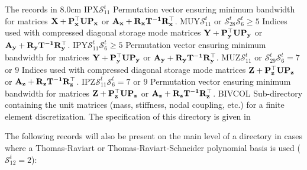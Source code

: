 \begin{DescriptionEnregistrement}{The  records in
}{8.0cm}
  {IPX}{$\mathcal{S}^{t}_{11}$}
  {Permutation vector ensuring minimum bandwidth for matrices $\bf{X}+\bf{P}_x^\top \bf{U}\bf{P}_x$ or $\bf{A}_x+\bf{R}_x\bf{T}^{-1}\bf{R}_x^\top$.} 
\OptIntEnr
  {MUY}{$\mathcal{S}^{t}_{11}$ or $\mathcal{S}^{t}_{28}$}{$\mathcal{S}^{t}_{6}\ge 5$}
  {Indices used with compressed diagonal storage mode matrices $\bf{Y}+\bf{P}_y^\top \bf{U}\bf{P}_y$ or $\bf{A}_y+\bf{R}_y\bf{T}^{-1}\bf{R}_y^\top$.} 
\OptIntEnr
  {IPY}{$\mathcal{S}^{t}_{11}$}{$\mathcal{S}^{t}_{6}\ge 5$}
  {Permutation vector ensuring minimum bandwidth for matrices $\bf{Y}+\bf{P}_y^\top \bf{U}\bf{P}_y$ or $\bf{A}_y+\bf{R}_y\bf{T}^{-1}\bf{R}_y^\top$.} 
\OptIntEnr
  {MUZ}{$\mathcal{S}^{t}_{11}$ or $\mathcal{S}^{t}_{29}$}{$\mathcal{S}^{t}_{6}=7$ or $9$}
  {Indices used with compressed diagonal storage mode matrices $\bf{Z}+\bf{P}_z^\top \bf{U}\bf{P}_z$ or $\bf{A}_z+\bf{R}_z\bf{T}^{-1}\bf{R}_z^\top$.} 
\OptIntEnr
  {IPZ}{$\mathcal{S}^{t}_{11}$}{$\mathcal{S}^{t}_{6}=7$ or $9$}
  {Permutation vector ensuring minimum bandwidth for matrices $\bf{Z}+\bf{P}_z^\top \bf{U}\bf{P}_z$ or $\bf{A}_z+\bf{R}_z\bf{T}^{-1}\bf{R}_z^\top$.} 
\DirEnr
  {BIVCOL}
  {Sub-directory containing the unit matrices (mass, stiffness, nodal coupling,
   etc.) for a finite element discretization.
  The specification of this directory is given in }
\end{DescriptionEnregistrement}

The following records will also be present on the main level of a 
directory in cases where a Thomas-Raviart or Thomas-Raviart-Schneider polynomial basis is used ($\mathcal{S}^{t}_{12}=2$):

